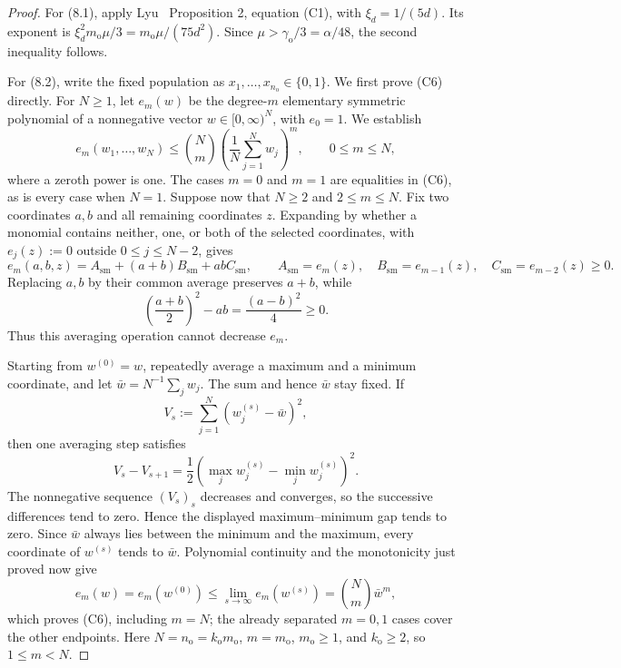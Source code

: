 \begin{proof}
For (8.1), apply Lyu~\citep{lyu2025} Proposition 2, equation (C1), with
\(\xi_d=1/(5d)\). Its exponent is
\(\xi_d^2m_{\mathrm o}\mu/3=m_{\mathrm o}\mu/(75d^2)\).
Since
\(\mu>\gamma_{\mathrm o}/3=\alpha/48\), the second inequality follows.

For (8.2), write the fixed population as
\(x_1,\ldots,x_{n_{\mathrm o}}\in\{0,1\}\). We first prove (C6)
directly. For \(N\ge1\), let \(e_m(w)\) be the degree-\(m\) elementary
symmetric polynomial of a nonnegative vector \(w\in[0,\infty)^N\), with
\(e_0=1\). We establish
\[
 e_m(w_1,\ldots,w_N)
 \le\binom Nm\left(\frac1N\sum_{j=1}^Nw_j\right)^m,
 \qquad 0\le m\le N,
\tag{C6}
\]
where a zeroth power is one. The
cases \(m=0\) and \(m=1\) are equalities in (C6), as is every case when
\(N=1\). Suppose now that \(N\ge2\) and \(2\le m\le N\). Fix two
coordinates \(a,b\) and all remaining coordinates \(z\). Expanding by
whether a monomial contains neither, one, or both of the selected
coordinates, with \(e_j(z):=0\) outside \(0\le j\le N-2\), gives
\[
e_m(a,b,z)=A_{\mathrm{sm}}+(a+b)B_{\mathrm{sm}}+abC_{\mathrm{sm}},
\qquad
A_{\mathrm{sm}}=e_m(z),\quad B_{\mathrm{sm}}=e_{m-1}(z),\quad
C_{\mathrm{sm}}=e_{m-2}(z)\ge0.
\tag{8.3a}
\]
Replacing \(a,b\) by their common average preserves \(a+b\), while
\[
\left(\frac{a+b}{2}\right)^2-ab=\frac{(a-b)^2}{4}\ge0.
\tag{8.3b}
\]
Thus this averaging operation cannot decrease \(e_m\).

Starting from \(w^{(0)}=w\), repeatedly average a maximum and a minimum
coordinate, and let \(\bar w=N^{-1}\sum_jw_j\). The sum and hence
\(\bar w\) stay fixed. If
\[
V_s:=\sum_{j=1}^N(w_j^{(s)}-\bar w)^2,
\]
then one averaging step satisfies
\[
V_s-V_{s+1}
=\frac12\left(\max_jw_j^{(s)}-\min_jw_j^{(s)}\right)^2.
\tag{8.3c}
\]
The nonnegative sequence \((V_s)_s\) decreases and converges, so the
successive differences tend to zero. Hence the displayed maximum--minimum
gap tends to zero. Since \(\bar w\) always lies between the minimum and the
maximum, every coordinate of \(w^{(s)}\) tends to \(\bar w\). Polynomial
continuity and the monotonicity just proved now give
\[
e_m(w)=e_m(w^{(0)})
\le\lim_{s\to\infty}e_m(w^{(s)})
=\binom Nm\bar w^m,
\tag{8.3d}
\]
which proves (C6), including \(m=N\); the already separated \(m=0,1\)
cases cover the other endpoints. Here
\(N=n_{\mathrm o}=k_{\mathrm o}m_{\mathrm o}\),
\(m=m_{\mathrm o}\), \(m_{\mathrm o}\ge1\), and \(k_{\mathrm o}\ge2\),
so \(1\le m<N\).


\end{proof}
